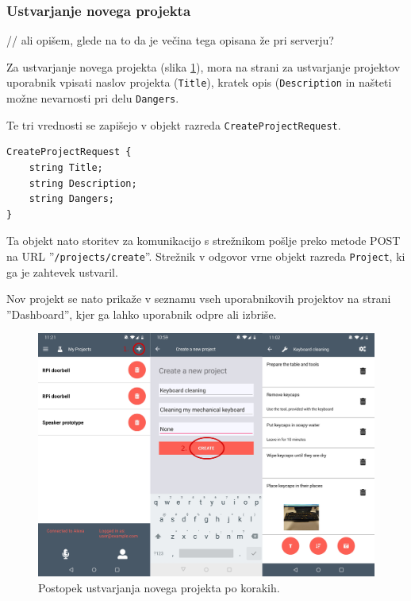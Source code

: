 \documentclass[a4paper, 12pt]{book}
\begin{document}
\subsubsection{Ustvarjanje novega projekta}

// ali opišem, glede na to da je večina tega opisana že pri serverju?

Za ustvarjanje novega projekta (slika \ref{app_newproject}), mora na strani za ustvarjanje projektov uporabnik vpisati naslov projekta (\texttt{Title}), kratek opis (\texttt{Description} in našteti možne nevarnosti pri delu \texttt{Dangers}.

Te tri vrednosti se zapišejo v objekt razreda \texttt{CreateProjectRequest}.
\begin{Verbatim}[commandchars=+\[\]]
CreateProjectRequest {
    string Title;
    string Description;
    string Dangers;
}
\end{Verbatim}

Ta objekt nato storitev za komunikacijo s strežnikom pošlje preko metode POST na URL ''\texttt{/projects/create}''.
Strežnik v odgovor vrne objekt razreda \texttt{Project}, ki ga je zahtevek ustvaril.

Nov projekt se nato prikaže v seznamu vseh uporabnikovih projektov na strani ''Dashboard'', kjer ga lahko uporabnik odpre ali izbriše.

\begin{figure}[H]
\begin{center}
\includegraphics[width=13cm]{app_newproject}
\end{center}
	\caption{Postopek ustvarjanja novega projekta po korakih.}
\label{app_newproject}
\end{figure}
\end{document}
